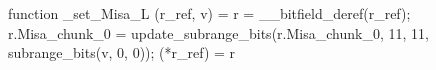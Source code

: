 function _set_Misa_L (r_ref, v) = {
    r = __bitfield_deref(r_ref);
    r.Misa_chunk_0 = update_subrange_bits(r.Misa_chunk_0, 11, 11, subrange_bits(v, 0, 0));
    (*r_ref) = r
}
